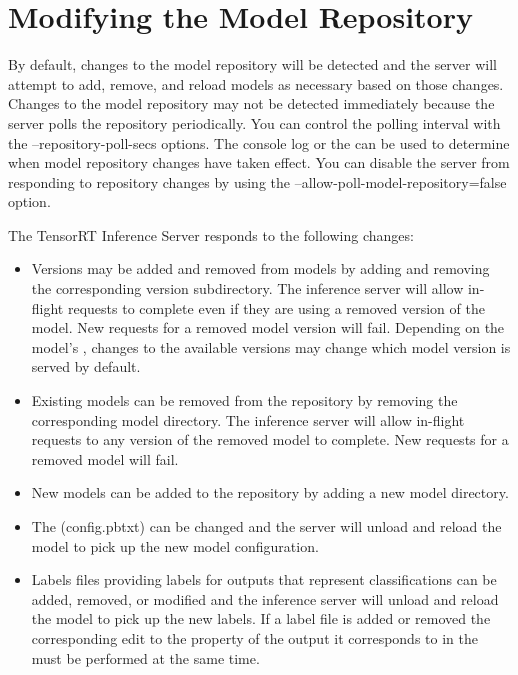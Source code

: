 \documentclass[letterpaper,10pt,english]{sphinxmanual}
\begin{document}
\section{Modifying the Model Repository}
\label{\detokenize{model_repository:modifying-the-model-repository}}\label{\detokenize{model_repository:section-modifying-the-model-repository}}
By default, changes to the model repository will be detected and the
server will attempt to add, remove, and reload models as necessary
based on those changes. Changes to the model repository may not be
detected immediately because the server polls the repository
periodically. You can control the polling interval with the
--repository-poll-secs options. The console log or the {\hyperref[\detokenize{http_grpc_api:section-api-status}]{}} can be used to determine when model
repository changes have taken effect. You can disable the server from
responding to repository changes by using the
--allow-poll-model-repository=false option.

The TensorRT Inference Server responds to the following changes:
\begin{itemize}
\item {} 
Versions may be added and removed from models by adding and removing
the corresponding version subdirectory. The inference server will
allow in-flight requests to complete even if they are using a
removed version of the model. New requests for a removed model
version will fail. Depending on the model’s {\hyperref[\detokenize{model_configuration:section-version-policy}]{}}, changes to the available versions may
change which model version is served by default.

\item {} 
Existing models can be removed from the repository by removing the
corresponding model directory.  The inference server will allow
in-flight requests to any version of the removed model to
complete. New requests for a removed model will fail.

\item {} 
New models can be added to the repository by adding a new model
directory.

\item {} 
The {\hyperref[\detokenize{model_configuration:section-model-configuration}]{}}
(config.pbtxt) can be changed and the server will unload and reload
the model to pick up the new model configuration.

\item {} 
Labels files providing labels for outputs that represent
classifications can be added, removed, or modified and the inference
server will unload and reload the model to pick up the new
labels. If a label file is added or removed the corresponding edit
to the  property of
the output it corresponds to in the {\hyperref[\detokenize{model_configuration:section-model-configuration}]{}} must be performed at the same time.

\end{itemize}
\end{document}
